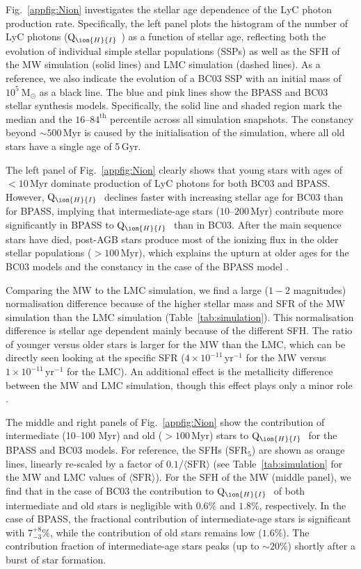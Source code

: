 \documentclass[fleqn,usenatbib]{mnras}
\newcommand\HI{\ion{H}{I}~} %
\begin{document}
Fig.~\ref{appfig:Nion} investigates the stellar age dependence of the LyC photon production rate. Specifically, the left panel plots the histogram of the number of LyC photons ($\mathrm{Q}_{\HI}$) as a function of stellar age, reflecting both the evolution of individual simple stellar populations (SSPs) as well as the SFH of the MW simulation (solid lines) and LMC simulation (dashed lines). As a reference, we also indicate the evolution of a BC03 SSP with an initial mass of $10^5~\text{M}_{\odot}$ as a black line. The blue and pink lines show the BPASS and BC03 stellar synthesis models. Specifically, the solid line and shaded region mark the median and the $16$--$84^\text{th}$ percentile across all simulation snapshots. The constancy beyond $\sim500$\,Myr is caused by the initialisation of the simulation, where all old stars have a single age of 5\,Gyr.

The left panel of Fig.~\ref{appfig:Nion} clearly shows that young stars with ages of $<10$\,Myr dominate production of LyC photons for both BC03 and BPASS. However, $\mathrm{Q}_{\HI}$ declines faster with increasing stellar age for BC03 than for BPASS, implying that intermediate-age stars ($10$--$200\,\mathrm{Myr}$) contribute more significantly in BPASS to $\mathrm{Q}_{\HI}$ than in BC03. After the main sequence stars have died, post-AGB stars produce most of the ionizing flux in the older stellar populations ($>100\,\mathrm{Myr}$), which explains the upturn at older ages for the BC03 models and the constancy in the case of the BPASS model \citep[e.g.,][]{byler19}. 

Comparing the MW to the LMC simulation, we find a large ($1-2$ magnitudes) normalisation difference because of the higher stellar mass and SFR of the MW simulation  than the LMC simulation (Table~\ref{tab:simulation}). This normalisation difference is stellar age dependent mainly because of the different SFH. The ratio of younger versus older stars is larger for the MW than the LMC, which can be directly seen looking at the specific SFR ($4\times10^{-11}\,\mathrm{yr}^{-1}$ for the MW versus $1\times10^{-11}\,\mathrm{yr}^{-1}$ for the LMC). An additional effect is the metallicity difference between the MW and LMC simulation, though this effect plays only a minor role \citep[e.g.,][]{choi17, byler17}. 

The middle and right panels of Fig.~\ref{appfig:Nion} show the contribution of intermediate (10--100 Myr) and old ($>100$\,Myr) stars to $\mathrm{Q}_{\HI}$ for the BPASS and BC03 models. For reference, the SFHs (SFR$_5$) are shown as orange lines, linearly re-scaled by a factor of $0.1/\langle \mathrm{SFR}\rangle$ (see Table~\ref{tab:simulation} for the MW and LMC values of $\langle \mathrm{SFR}\rangle$). For the SFH of the MW (middle panel), we find that in the case of BC03 the contribution to $\mathrm{Q}_{\HI}$ of both intermediate and old stars is negligible with $0.6\%$ and $1.8\%$, respectively. In the case of BPASS, the fractional contribution of intermediate-age stars is significant with $7_{-3}^{+8}\%$, while the contribution of old stars remains low ($1.6\%$). The contribution fraction of intermediate-age stars peaks (up to $\sim20\%$) shortly after a burst of star formation.
\end{document}
